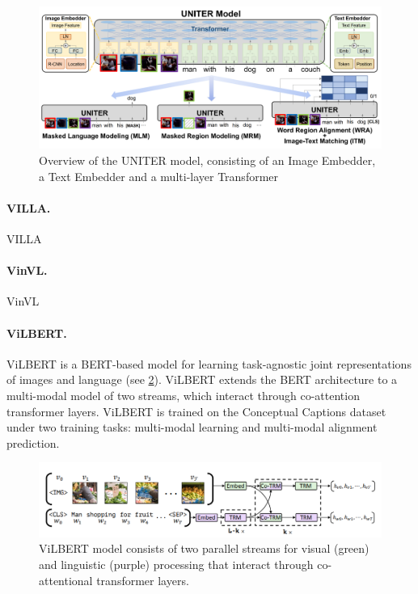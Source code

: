 \begin{figure}[ht]
    \centering
    \includegraphics[width=\linewidth]{images/models/uniter.png}
    \caption{Overview of the UNITER model, consisting of an Image Embedder, a Text Embedder and a multi-layer Transformer}
    \label{fig:uniter}
\end{figure}

\paragraph{VILLA.} VILLA \cite{gan2020villa} 

\paragraph{VinVL.} VinVL \cite{zhang2021vinvl}

\paragraph{ViLBERT.} ViLBERT \cite{lu2019vilbert} is a BERT-based model for learning task-agnostic joint representations of images and language (see \cref{fig:vilbert}). ViLBERT extends the BERT architecture to a multi-modal model of two streams, which interact through co-attention transformer layers. ViLBERT is trained on the Conceptual Captions dataset under two training tasks: multi-modal learning and multi-modal alignment prediction.

\begin{figure}[ht]
    \centering
    \includegraphics[width=\linewidth]{images/models/vilbert.png}
    \caption{ViLBERT model consists of two parallel streams for visual (green) and linguistic (purple) processing that interact through co-attentional transformer layers.}
    \label{fig:vilbert}
\end{figure}

